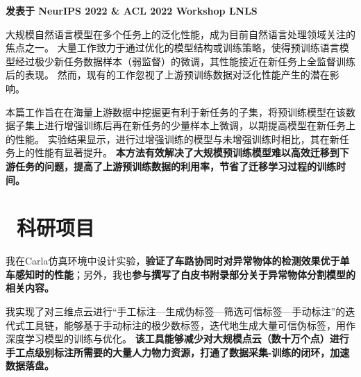 \documentclass{resume}
\begin{document}
\begin{spacing}{1.2}
  \textbf{发表于 NeurIPS 2022 \& ACL 2022 Workshop LNLS}
  
  \vspace{0.5em}
  大规模自然语言模型在多个任务上的泛化性能，成为目前自然语言处理领域关注的焦点之一。
  大量工作致力于通过优化的模型结构或训练策略，使得预训练语言模型经过极少新任务数据样本（弱监督）的微调，其性能接近在新任务上全监督训练后的表现。
  然而，现有的工作忽视了上游预训练数据对泛化性能产生的潜在影响。
  
  \vspace{0.5em}
  本篇工作旨在在海量上游数据中挖掘更有利于新任务的子集，将预训练模型在该数据子集上进行增强训练后再在新任务的少量样本上微调，以期提高模型在新任务上的性能。
  实验结果显示，进行过增强训练的模型与未增强训练时相比，其在新任务上的性能有显著提升。
  \textbf{本方法有效解决了大规模预训练模型难以高效迁移到下游任务的问题，提高了上游预训练数据的利用率，节省了迁移学习过程的训练时间。}
  
\end{spacing}


\section{\faServer\ 科研项目}

我在Carla仿真环境中设计实验，\textbf{验证了车路协同时对异常物体的检测效果优于单车感知时的性能}；另外，我也\textbf{参与撰写了白皮书附录部分关于异常物体分割模型的相关内容。}

我实现了对三维点云进行“手工标注—生成伪标签—筛选可信标签—手动标注”的迭代式工具链，能够基于手动标注的极少数标签，迭代地生成大量可信伪标签，用作深度学习模型的训练与优化。
\textbf{该工具能够减少对大规模点云（数十万个点）进行手工点级别标注所需要的大量人力物力资源，打通了数据采集-训练的闭环，加速数据落盘。}
\end{document}
